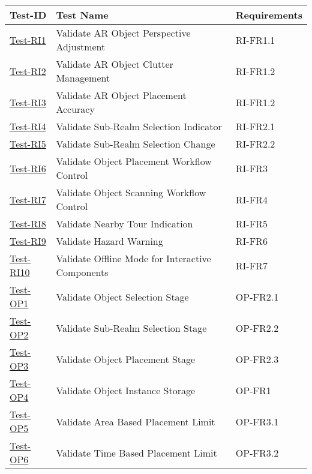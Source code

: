 \documentclass[12pt, titlepage]{article}
\begin{document}
\begin{table}[htpb!]
    \centering
    \begin{tabular}{|l|p{8cm}|p{3cm}|}
        \hline
        \textbf{Test-ID} & \textbf{Test Name} &\textbf{Requirements} \\
        \hline
        \hyperref[itm:Test-RI1]{Test-RI1} & Validate AR Object Perspective Adjustment & RI-FR1.1 \\
        \hline
        \hyperref[itm:Test-RI2]{Test-RI2} & Validate AR Object Clutter Management & RI-FR1.2 \\
        \hline
        \hyperref[itm:Test-RI3]{Test-RI3} & Validate AR Object Placement Accuracy & RI-FR1.2 \\
        \hline
        \hyperref[itm:Test-RI4]{Test-RI4} & Validate Sub-Realm Selection Indicator & RI-FR2.1 \\
        \hline
        \hyperref[itm:Test-RI5]{Test-RI5} & Validate Sub-Realm Selection Change & RI-FR2.2 \\
        \hline
        \hyperref[itm:Test-RI6]{Test-RI6} & Validate Object Placement Workflow Control & RI-FR3 \\
        \hline
        \hyperref[itm:Test-RI7]{Test-RI7} & Validate Object Scanning Workflow Control & RI-FR4 \\
        \hline
        \hyperref[itm:Test-RI8]{Test-RI8} & Validate Nearby Tour Indication & RI-FR5 \\
        \hline
        \hyperref[itm:Test-RI9]{Test-RI9} & Validate Hazard Warning & RI-FR6 \\
        \hline
        \hyperref[itm:Test-RI10]{Test-RI10} & Validate Offline Mode for Interactive Components & RI-FR7 \\
        \hline
        \hyperref[itm:Test-OP1]{Test-OP1} & Validate Object Selection Stage & OP-FR2.1 \\
        \hline
        \hyperref[itm:Test-OP2]{Test-OP2} & Validate Sub-Realm Selection Stage & OP-FR2.2 \\
        \hline
        \hyperref[itm:Test-OP3]{Test-OP3} & Validate Object Placement Stage & OP-FR2.3 \\
        \hline
        \hyperref[itm:Test-OP4]{Test-OP4} & Validate Object Instance Storage & OP-FR1 \\
        \hline
        \hyperref[itm:Test-OP5]{Test-OP5} & Validate Area Based Placement Limit & OP-FR3.1 \\
        \hline
        \hyperref[itm:Test-OP6]{Test-OP6} & Validate Time Based Placement Limit & OP-FR3.2 \\

\end{tabular}
\end{table}
\end{document}
